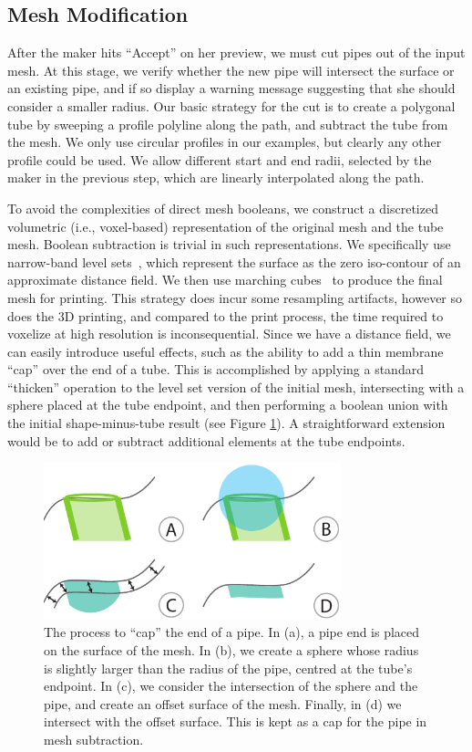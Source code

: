 \subsection{Mesh Modification}
After the maker hits ``Accept'' on her preview, we must cut pipes out of the input mesh.  At this stage, we verify whether the new pipe will intersect the surface or an existing pipe, and if so display a warning message suggesting that she should consider a smaller radius.
Our basic strategy for the cut is to create a polygonal tube by sweeping a profile polyline
along the path, and subtract the tube from the mesh. We only use circular profiles
in our examples, but clearly any other profile could be used. 
We allow different start and end radii, selected by the maker in the previous step, which are linearly interpolated along the path.

To avoid the complexities of direct mesh booleans, we construct a discretized volumetric (i.e., voxel-based) representation of the original mesh and the tube mesh.  Boolean subtraction is trivial in such representations.  We specifically use narrow-band level sets~\cite{Museth04}, which represent the surface as the zero iso-contour of an
approximate distance field.
We then use marching cubes~\cite{Lorensen87} to produce the final mesh for printing.
This strategy does incur some resampling artifacts, however so does the 3D printing, and compared to the print process, the time required to voxelize at high resolution is inconsequential.
Since we have a distance field, we can easily introduce useful effects, such as the
ability to add a thin membrane ``cap'' over the end of a tube. 
This is accomplished by applying a standard ``thicken'' operation to the level set version
of the initial mesh, intersecting with a sphere placed at the tube endpoint, and then performing
a boolean union with the initial shape-minus-tube result (see Figure \ref{fig:cap}).
A straightforward extension would be to add or subtract additional elements at
the tube endpoints.

\begin{figure}[t]
\centering
    \includegraphics[width=3.4in]{figures/cap.pdf}
\caption{The process to ``cap'' the end of a pipe.  In (a), a pipe end is placed on the surface of the mesh.  In (b), we create a sphere whose radius is slightly larger than the radius of the pipe, centred at the tube's endpoint.  In (c), we consider the intersection of the sphere and the pipe, and create an offset surface of the mesh.  Finally, in (d) we intersect with the offset surface.  This is kept as a cap for the pipe in mesh subtraction.}
\label{fig:cap}
\end{figure}

